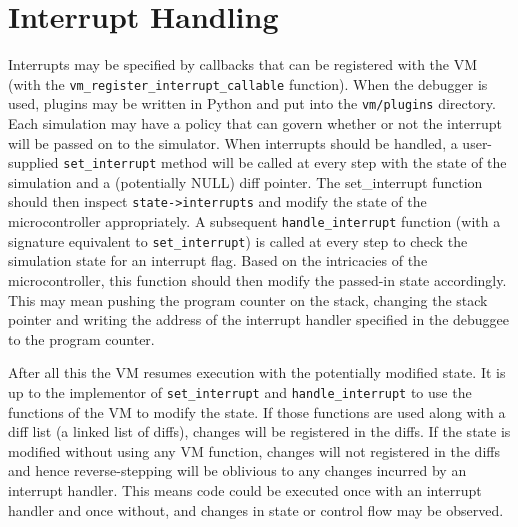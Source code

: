 \section[Interrupt Handling]{Interrupt Handling}
\begin{comment}
Interrupts in \ac{ESSIG} can occur at two different levels:

\begin{enumerate}
\item {
From outside of the VM through the vm\_interrupt method }
\item {
From a peripheral }
\end{enumerate}
\end{comment}
Interrupts may be specified by callbacks that can be registered with the VM
(with the \texttt{vm\_register\_interrupt\_callable} function). When the debugger
is used, plugins may be written in Python and put into the \texttt{vm/plugins}
directory.\\
Each simulation may have a policy that can govern whether or not the interrupt will be
passed on to the simulator. When interrupts should be handled, a user-supplied
\texttt{set\_interrupt} method will be called at every step with the state of the
simulation and a (potentially NULL) diff pointer. The set\_interrupt function
should then inspect \texttt{state->interrupts} and modify the state of the
microcontroller appropriately. A subsequent \texttt{handle\_interrupt}
function (with a signature equivalent to \texttt{set\_interrupt}) is 
called at every step to check the simulation state for an
interrupt flag. Based on the intricacies of the microcontroller, this function
should then modify
the passed-in state accordingly. This may mean pushing the program counter on the stack,
changing
the stack pointer and writing the address of the interrupt handler specified
in the debuggee to the program counter.

After all this the VM resumes execution with the potentially modified state.
It is up to the implementor of \texttt{set\_interrupt} and 
\texttt{handle\_interrupt} to use the functions of the VM to modify the state.
If those functions are used along with a diff list (a linked list of diffs), changes will be
registered in the diffs. If the state is modified without using any VM
function,
changes will not registered in the diffs and hence reverse-stepping will be oblivious to
any changes incurred by an interrupt handler. This means code could be executed
once with an interrupt handler and once without, and changes in state or
control flow may be observed.

